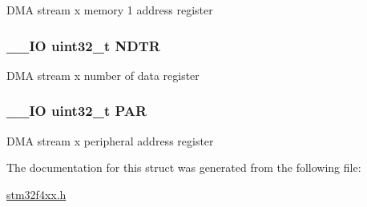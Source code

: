 D\-M\-A stream x memory 1 address register \hypertarget{struct_d_m_a___stream___type_def_af60258ad5a25addc1e8969665d0c1731}{
\subsubsection[{N\-D\-T\-R}]{\setlength{\rightskip}{0pt plus 5cm}\-\_\-\-\_\-\-I\-O uint32\-\_\-t N\-D\-T\-R}}\label{struct_d_m_a___stream___type_def_af60258ad5a25addc1e8969665d0c1731}
D\-M\-A stream x number of data register \hypertarget{struct_d_m_a___stream___type_def_aef55be3d948c22dd32a97e8d4f8761fd}{
\subsubsection[{P\-A\-R}]{\setlength{\rightskip}{0pt plus 5cm}\-\_\-\-\_\-\-I\-O uint32\-\_\-t P\-A\-R}}\label{struct_d_m_a___stream___type_def_aef55be3d948c22dd32a97e8d4f8761fd}
D\-M\-A stream x peripheral address register 

The documentation for this struct was generated from the following file\-:\begin{DoxyCompactItemize}
\item 
\hyperlink{stm32f4xx_8h}{stm32f4xx.\-h}\end{DoxyCompactItemize}
